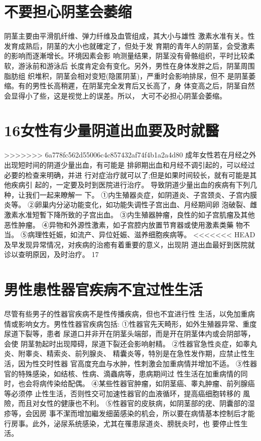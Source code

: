 \documentclass[12pt,UTF8]{ctexbook}
\begin{document}
\section{不要担心阴茎会萎缩}
阴茎主要由平滑肌纤维、弹力纤维及血管组成，其大小与雄性
激素水准有关。性发育成熟后，阴茎的大小也就確定了，但处于发
育期的青年人的阴茎，会受激素的影响而逐漸增长。环境因素会影
响测量结果，阴茎没有骨骼组织，平时比较柔软，游泳前和游泳后
长度肯定会有变化。另外，男性在身体发胖之后，阴茎周围脂肪组
织堆积，阴茎会相对变短(隐匿阴茎)，严重时会影响排尿，但不
是阴茎萎缩。有的男性长高稍遲，在阴茎完全发育后又长高了，身
体变高之后，阴茎自然会显得小了些，这是视觉上的误差。所以，
大可不必担心阴茎会萎缩。
\section{16女性有少量阴道出血要及时就醫}
>>>>>>> 6a778fc562d55006c4c857432af74f4b1a2a4d80
成年女性若在月经之外出现短时间的阴道少量出血，有可能是
排卵期出血和月经不调引起的，可以经过必要的检查来明确，并进
行对症治疗就可以了;但是如果时间较长，就有可能是其他疾病引
起的，一定要及时到医院进行治疗。
导致阴道少量出血的疾病有下列几种，让我们一起来瞭解一
下。
①内生殖器炎症，如阴道炎、子宫颈炎、子宫内膜炎等。
②卵巢内分泌功能变化，如功能失调性子宫出血、月经期间卵
泡破裂、雌激素水准短暫下降所致的子宫出血。
③内生殖器肿瘤，良性的如子宫肌瘤及其他恶性肿瘤。
④异物和外源性激素，如子宫腔内放置节育器或使用激素类藥
物不当。
⑤病理性妊娠，如流产、异位妊娠、滋养细胞疾病等。
<<<<<<< HEAD
及早发现异常情况，对疾病的治癒有着重要的意义，出现阴
道出血最好到医院就诊以查明原因，及时治疗。
17
\section{男性患性器官疾病不宜过性生活}
尽管有些男子的性器官疾病不是性传播疾病，但也不宜进行性
生活，以免加重病情或影响女方。男性性器官疾病包括:
①性器官先天畸形，如外生殖器异常、重度尿道下裂等，患者
尿道口并非开在阴茎头端部，而是开在阴茎体内或会阴部等，会使
阴茎勃起时出现障碍，尿道下裂还会影响射精。
②性器官急性炎症，如睾丸炎、附睾炎、精索炎、前列腺炎、
精囊炎等，特別是在急性发作期，应禁止性生活，因为性交时性器
官高度充血与水肿，性刺激会加重病情并增加不适。
③性器官的特殊感染，如结核、性病、滴蟲病等，患病期间过
性生活在加重病情的同时，也会将病传染给配偶。
④某些性器官肿瘤，如阴茎癌、睾丸肿瘤、前列腺癌等必须停
止性生活，否则性交可加速性器官的血液循环，提高癌细胞转移的
風險，而且对女性的健康也不利。
⑤性器官的皮肤病，如阴茎部的疣、阴囊部的湿疹等，会因房
事不潔而增加繼发细菌感染的机会，所以要在病情基本控制后才能
行房事。此外，泌尿系统感染，尤其在罹患尿道炎、膀胱炎时，也
要停止性生活。
\end{document}
